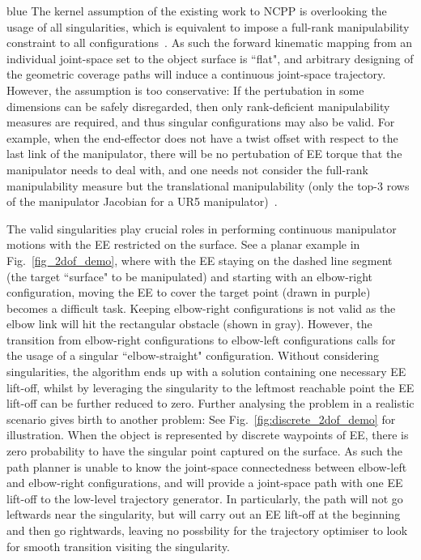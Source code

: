 \documentclass[Afour,sageh,times]{sagej}
\begin{document}
\begin{color}{blue}
The kernel assumption of the existing work to NCPP is overlooking the usage of all singularities, which is equivalent to impose a full-rank manipulability constraint to all configurations~\cite{yoshikawa1990translational}. 
As such the forward kinematic mapping from an individual joint-space set to the object surface is ``flat", and arbitrary designing of the geometric coverage paths will induce a continuous joint-space trajectory. 
However, the assumption is too conservative: If the pertubation in some dimensions can be safely disregarded, then only rank-deficient manipulability measures are required, and thus singular configurations may also be valid. 
For example, when the end-effector does not have a twist offset with respect to the last link of the manipulator, there will be no pertubation of EE torque that the manipulator needs to deal with, and one needs not consider the full-rank manipulability measure but the translational manipulability (only the top-$3$ rows of the manipulator Jacobian for a UR5 manipulator)~\cite{yoshikawa1990translational}. 

The valid singularities play crucial roles in performing continuous manipulator motions with the EE restricted on the surface. 
See a planar example in Fig.~\ref{fig_2dof_demo}, where with the EE staying on the dashed line segment (the target ``surface" to be manipulated) and starting with an elbow-right configuration, moving the EE to cover the target point (drawn in purple) becomes a difficult task. 
Keeping elbow-right configurations is not valid as the elbow link will hit the rectangular obstacle (shown in gray). 
However, the transition from elbow-right configurations to elbow-left configurations calls for the usage of a singular ``elbow-straight" configuration. 
Without considering singularities, the algorithm ends up with a solution containing one necessary EE lift-off, whilst by leveraging the singularity to the leftmost reachable point the EE lift-off can be further reduced to zero. 
Further analysing the problem in a realistic scenario gives birth to another problem: 
See Fig.~\ref{fig:discrete_2dof_demo} for illustration. 
When the object is represented by discrete waypoints of EE, there is zero probability to have the singular point captured on the surface. 
As such the path planner is unable to know the joint-space connectedness between elbow-left and elbow-right configurations, and will provide a joint-space path with one EE lift-off to the low-level trajectory generator. 
In particularly, the path will not go leftwards near the singularity, but will carry out an EE lift-off at the beginning and then go rightwards, leaving no possbility for the trajectory optimiser to look for smooth transition visiting the singularity. 


\end{color}
\end{document}
